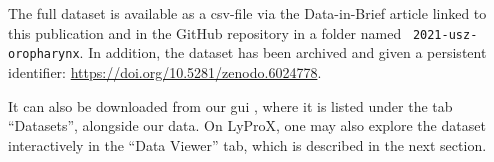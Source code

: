 \begin{tcolorbox}[
    title=\faIcon{database} Data,
    parbox=false,
    float
]
    The full dataset is available as a \acrshort{csv}-file via the Data-in-Brief article linked to this publication \cite{ludwig_dataset_2022} and in the GitHub repository  in a folder named ~\texttt{2021-usz-oropharynx}. In addition, the dataset has been archived and given a persistent identifier: \url{https://doi.org/10.5281/zenodo.6024778}.

    It can also be downloaded from our \gls{gui} , where it is listed under the tab ``Datasets'', alongside our data. On LyProX, one may also explore the dataset interactively in the ``Data Viewer'' tab, which is described in the next section.
\end{tcolorbox}